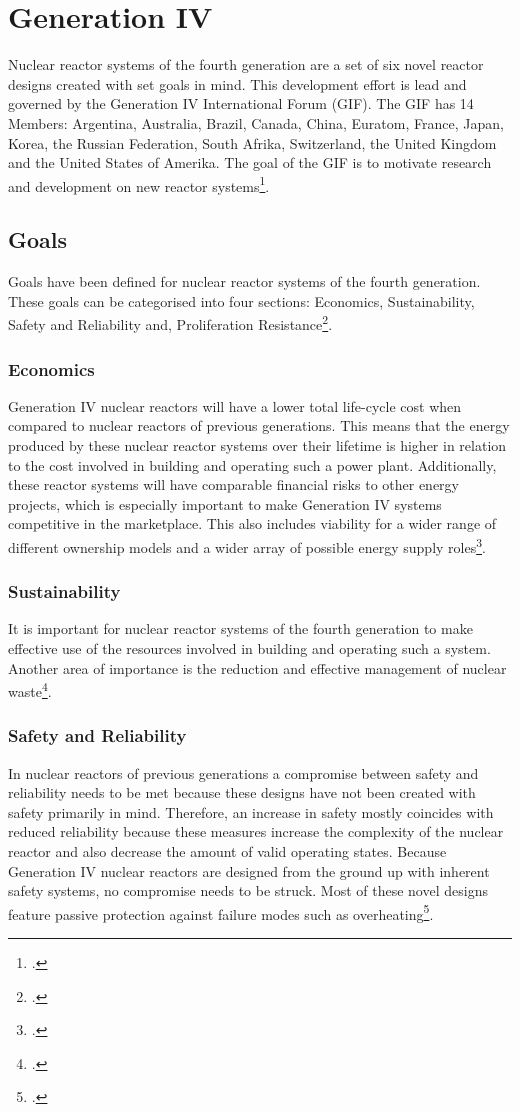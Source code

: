 \chapter{Generation IV}
Nuclear reactor systems of the fourth generation are a set of six novel reactor designs created with
set goals in mind. This development effort is lead and governed by the Generation IV International Forum
(GIF). The GIF has 14 Members: Argentina, Australia, Brazil, Canada, China, Euratom, France, Japan,
Korea, the Russian Federation, South Afrika, Switzerland, the United Kingdom and the United States of Amerika.
The goal of the GIF is to motivate research and development on new reactor systems\footcite[6]{GIFAR}.
\section{Goals}
Goals have been defined for nuclear reactor systems of the fourth generation. These goals
can be categorised into four sections: Economics, Sustainability, Safety and Reliability and, Proliferation Resistance\footcite[38]{IVHandbook}.
\subsection{Economics}
Generation IV nuclear reactors will have a lower total life-cycle cost when compared to nuclear reactors
of previous generations. This means that the energy produced by these nuclear reactor systems over
their lifetime is higher in relation to the cost involved in building and operating such a power plant.
Additionally, these reactor systems will have comparable financial risks to other energy projects, which
is especially important to make Generation IV systems competitive in the marketplace. This also includes
viability for a wider range of different ownership models and a wider array of possible energy supply roles\footcite[6]{GIFAR}.
\subsection{Sustainability}
It is important for nuclear reactor systems of the fourth generation to make effective use of the resources
involved in building and operating such a system. Another area of importance is the reduction and effective
management of nuclear waste\footcite[38]{IVHandbook}.
\subsection{Safety and Reliability}
In nuclear reactors of previous generations a compromise between safety and reliability needs to be met
because these designs have not been created with safety primarily in mind. Therefore, an increase in safety
mostly coincides with reduced reliability because these measures increase the complexity of the nuclear reactor and
also decrease the amount of valid operating states. Because Generation IV nuclear reactors are designed from the ground up
with inherent safety systems, no compromise needs to be struck. Most of these novel designs feature passive
protection against failure modes such as overheating\footcite[6]{GIFAR}.
